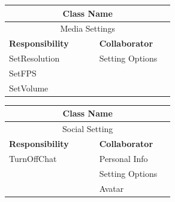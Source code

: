 \documentclass[a4paper]{article}
\begin{document}
	\noindent\begin{minipage}{\textwidth}
	 	\begin{minipage}[t]{0.48\textwidth}
		\centering
		\makeatletter{}\makeatother\caption*{}
			\begin{tabular}{|p{0.48\linewidth}|p{0.40\linewidth}|} 
				\hline
				\multicolumn{2}{|c|}{\textbf{Class Name}} \\
				\hline
				\multicolumn{2}{|c|}{Media Settings} \\
				\hline
				\textbf{Responsibility} & \textbf{Collaborator} \\
				\hline
				SetResolution & Setting Options\\
				SetFPS &  \\
				SetVolume & \\
				\hline
			\end{tabular}
		\end{minipage}
		\begin{minipage}[t]{0.48\textwidth}
		\centering
		\makeatletter{}\makeatother\caption*{}
			\begin{tabular}{|p{0.48\linewidth}|p{0.40\linewidth}|} 
				\hline
				\multicolumn{2}{|c|}{\textbf{Class Name}} \\
				\hline
				\multicolumn{2}{|c|}{Social Setting} \\
				\hline
				\textbf{Responsibility} & \textbf{Collaborator} \\
				\hline
				TurnOffChat & Personal Info\\
				& Setting Options\\
				& Avatar\\
				\hline
			\end{tabular}
		\end{minipage}
   	\end{minipage}
\end{document}
